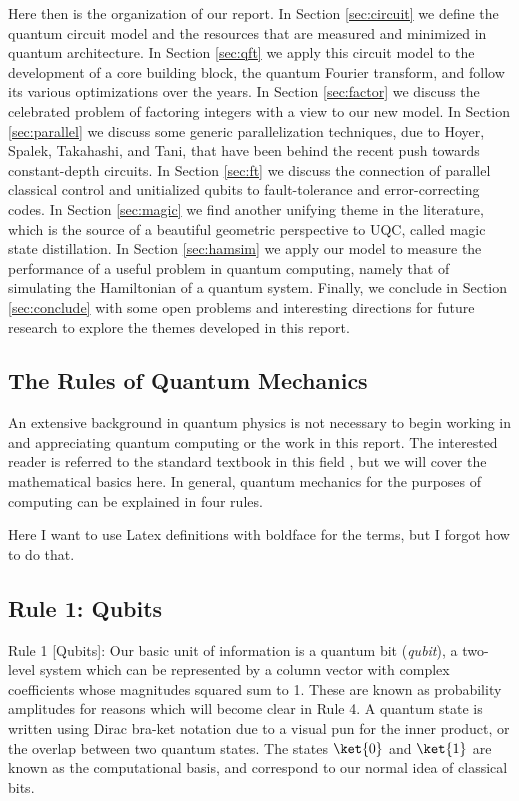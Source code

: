 Here then is the organization of our report.
In Section \ref{sec:circuit} we define the quantum circuit model and the
resources that are measured and minimized in quantum architecture. In
Section \ref{sec:qft} we apply this circuit model to the development of
a core building block, the quantum Fourier transform, and follow its
various optimizations over the years. In Section \ref{sec:factor} we
discuss the celebrated problem of factoring integers with a view to our new
model. In Section \ref{sec:parallel} we discuss some generic
parallelization techniques, due to Hoyer, Spalek, Takahashi, and Tani,
that have been behind the recent push towards constant-depth circuits.
In Section \ref{sec:ft} we discuss the connection of parallel classical
control and unitialized qubits to fault-tolerance and error-correcting codes.
In Section \ref{sec:magic} we find another unifying theme in the literature,
which is the source of a beautiful geometric perspective to UQC, called
magic state distillation. In Section \ref{sec:hamsim} we apply our model to
measure the performance of a useful problem in quantum computing,
namely that of simulating the Hamiltonian of a quantum system.
Finally, we conclude in Section \ref{sec:conclude} with some open problems
and interesting directions for future research to explore the themes developed
in this report.

\subsection{The Rules of Quantum Mechanics}

An extensive background in quantum physics is not necessary to begin
working in and appreciating quantum computing or the work in this report.
The interested reader is referred to the standard textbook in this field
\cite{Nielsen2000}, but we will cover the mathematical basics here.
In general, quantum mechanics for the purposes of computing can be
explained in four rules.

Here I want to use Latex definitions with boldface for the terms, but I
forgot how to do that.

\subsection{Rule 1: Qubits}

\begin{definition}
Rule 1 [Qubits]: Our basic unit of information is a quantum bit (\emph{qubit}),
a two-level system which can be represented by a column vector with
complex coefficients whose magnitudes squared sum to 1. These are known
as probability amplitudes for reasons which will become clear in Rule 4.
A quantum state
is written using Dirac bra-ket notation due to a visual pun for the
inner product, or the overlap between two quantum states.
The states $\ket{0}$ and $\ket{1}$ are known as the computational basis,
and correspond to our normal idea of classical bits.
\end{definition}

